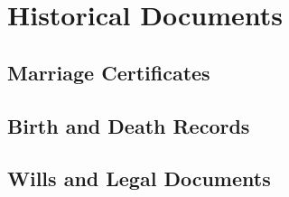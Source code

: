 \chapter{Historical Documents}

\section{Marriage Certificates}

\section{Birth and Death Records}

\section{Wills and Legal Documents}